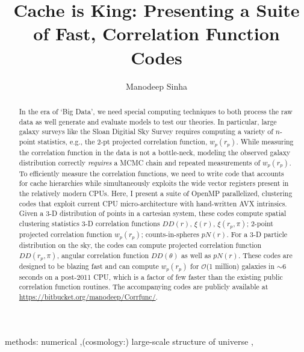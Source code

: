 \documentclass[preprint,authoryear,12pt]{elsarticle}
\newcommand{\xir}{\ensuremath{{DD(r)}}\xspace}
\newcommand{\xiofr}{\ensuremath{{\xi(r)}}\xspace}
\newcommand{\wprp}{\ensuremath{{w_p(r_p)}}\xspace}
\newcommand{\xirppi}{\ensuremath{{\xi(r_p,\pi)}}\xspace}
\newcommand{\cis}{\ensuremath{{pN(r)}}\xspace}
\newcommand{\ddrppi}{\ensuremath{{DD(r_p,\pi)}}\xspace}
\newcommand{\wtheta}{\ensuremath{{DD(\theta)}}\xspace}
\begin{document}
\begin{frontmatter}

\title{Cache is King: Presenting a Suite of Fast, Correlation Function Codes}

\author[ms]{Manodeep Sinha}
\address[ms]{6902 Stevenson Center, Department of Physics \& Astronomy, Vanderbilt University, Nashville, TN 37235}

\begin{abstract}
In the era of `Big Data', we need special computing techniques to both process the raw data as well 
generate and evaluate models to test our theories. In particular, large galaxy surveys
like the Sloan Digitial Sky Survey requires computing a variety of $n$-point statistics, e.g., the 
2-pt projected correlation function, $\wprp$. While measuring the correlation function in the data is not a bottle-neck, 
modeling the observed galaxy distribution correctly
{\em requires} a MCMC chain and repeated measurements of $\wprp$. To efficiently 
measure the correlation functions, we need to write code that accounts for cache hierarchies while 
simultaneously exploits the wide vector registers present in the relatively modern CPUs.  
Here, I present a suite of OpenMP parallelized, clustering codes that exploit current CPU micro-architecture with hand-written AVX 
intrinsics. Given a 3-D distribution of points in a cartesian system, these codes compute spatial clustering statistics 3-D correlation functions \xir, \xiofr, \xirppi; 2-point 
projected correlation function \wprp; counts-in-spheres \cis. For a 3-D particle distribution on the sky, the codes can compute 
projected correlation function \ddrppi, angular correlation function \wtheta as well as \cis. These codes are designed to be blazing fast 
and can compute \wprp for $\mathcal{O}$(1 million) galaxies in $\sim 6$ seconds on a post-2011 CPU, which is a factor of few faster than 
the existing public correlation function routines.  
The accompanying codes are publicly available at \url{https://bitbucket.org/manodeep/Corrfunc/}. 
\end{abstract}

\begin{keyword}
methods: numerical \sep (cosmology:) large-scale structure of universe \sep
\end{keyword}

\end{frontmatter}
\end{document}
